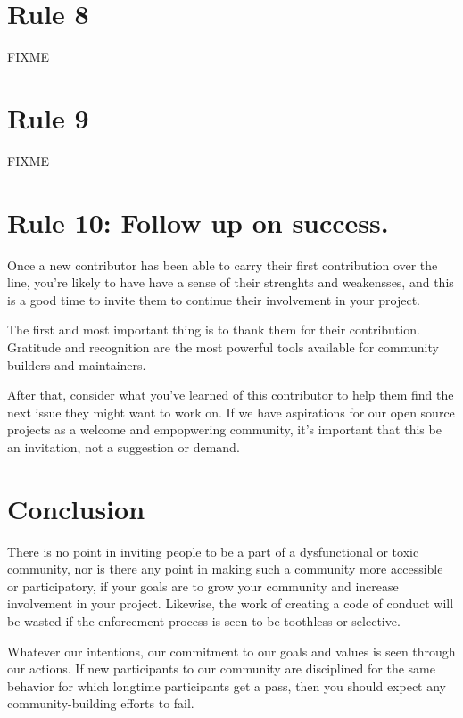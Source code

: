 \documentclass[10pt,letterpaper]{article}
\newcommand{\rulemajor}[1]{\section{#1}}
\begin{document}
\rulemajor{Rule 8}

FIXME

\rulemajor{Rule 9}

FIXME

\rulemajor{Rule 10: Follow up on success.}

Once a new contributor has been able to carry their first contribution over the line, 
you're likely to have have a sense of their strenghts and weakensses,
and this is a good time to invite them to continue their involvement in your project.

The first and most important thing is to thank them for their contribution.
Gratitude and recognition are the most powerful tools available for community builders and maintainers. 

After that,
consider what you've learned of this contributor to help them find
the next issue they might want to work on.
If we have aspirations for our open source projects as a welcome and empopwering community,
it's important that this be an invitation,
not a suggestion or demand. 

\section*{Conclusion}

There is no point in inviting people to be a part of a dysfunctional or toxic community,
nor is there any point in making such a community more accessible or participatory,
if your goals are to grow your community and increase involvement in your project.
Likewise,
the work of creating a code of conduct will be wasted
if the enforcement process is seen to be toothless or selective.

Whatever our intentions,
our commitment to our goals and values is seen through our actions.
If new participants to our community are disciplined for the same behavior
for which longtime participants get a pass,
then you should expect any community-building efforts to fail.


\end{document}
